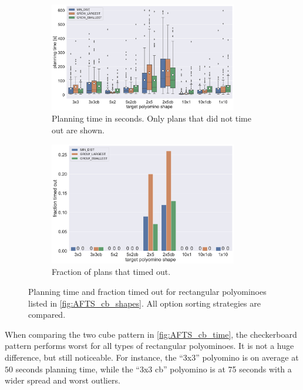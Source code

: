 \begin{figure}
	\centering
	\begin{subfigure}[b]{\textwidth}
		\centering
		\includegraphics[width=0.9\textwidth]{figures/plots/AFTS_cb_time.pdf}
		\caption{Planning time in seconds. Only plans that did not time out are shown.}
		\label{fig:AFTS_cb_time}
	\end{subfigure}
	
	\begin{subfigure}[b]{\textwidth}
		\centering
		\includegraphics[width=0.9\textwidth]{figures/plots/AFTS_cb_timeout.pdf}
		\caption{Fraction of plans that timed out.}
		\label{fig:AFTS_cb_timeout}
	\end{subfigure}
	\caption[Planning time and fraction timed out for rectangular polyominoes]{Planning time and fraction timed out for rectangular polyominoes listed in \autoref{fig:AFTS_cb_shapes}. All option sorting strategies are compared.}
	\label{fig:AFTS_cb_timestats}
\end{figure}

When comparing the two cube pattern in \autoref{fig:AFTS_cb_time}, the checkerboard pattern performs worst for all types of rectangular polyominoes.
It is not a huge difference, but still noticeable.
For instance, the ``3x3'' polyomino is on average at $50$ seconds planning time, while the ``3x3 cb'' polyomino is at 75 seconds with a wider spread and worst outliers.

